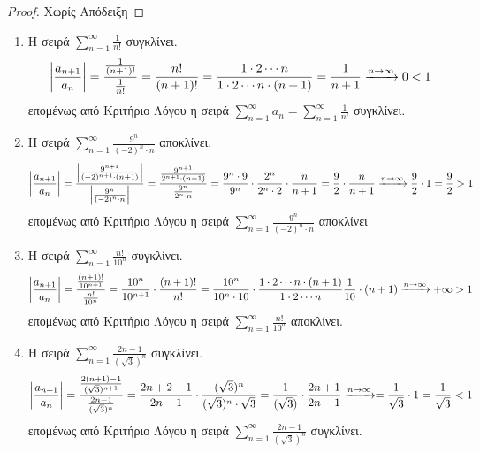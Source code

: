 \begin{proof}
    Χωρίς Απόδειξη
\end{proof}

\begin{examples}
\item {}
    \begin{enumerate}
        \item Η σειρά $ \sum_{n=1}^{\infty} \frac{1}{n!} $ συγκλίνει.
            \[
                \abs{\frac{a_{n+1}}{a_{n}}} = \frac{\frac{1}{(n+1)!}}{\frac{1}{n!}} = 
                \frac{n!}{(n+1)!} = \frac{1 \cdot 2 \cdots n }{1 \cdot 2 
                \cdots n \cdot(n+1)} = \frac{1}{n+1} \xrightarrow{n \to \infty } 0 < 1 
            \]
            επομένως από Κριτήριο Λόγου η σειρά $ \sum_{n=1}^{\infty} a_{n} = 
            \sum_{n=1}^{\infty} \frac{1}{n!}$ συγκλίνει.

        \item Η σειρά $ \sum_{n=1}^{\infty} \frac{9^{n}}{(-2)^{n}\cdot n} $ αποκλίνει.
            \[
                \abs{\frac{a_{n+1}}{a_{n}}} = \frac{\abs{\frac{9^{n+1}}{(-2)^{n+1}\cdot
                (n+1)}}}{\abs{\frac{9^{n}}{(-2)^{n}\cdot n}}} = 
                \frac{\frac{9^{n+1}}{2^{n+1}\cdot (n+1)}}{\frac{9^{n}}{2^{n}\cdot n}} 
                = \frac{9^{n}\cdot 9}{9^{n}} \cdot \frac{2^{n}}{2^{n}\cdot 2}\cdot 
                \frac{n}{n+1} = \frac{9}{2} \cdot \frac{n}{n+1} \xrightarrow{n \to 
                \infty} \frac{9}{2} \cdot 1 = \frac{9}{2}> 1
            \] 
            επομένως από Κριτήριο Λόγου η σειρά 
            $ \sum_{n=1}^{\infty} \frac{9^{n}}{(-2)^{n}\cdot n} $ αποκλίνει

        \item Η σειρά $ \sum_{n=1}^{\infty} \frac{n!}{10^{n}} $ συγκλίνει.
            \[
                \abs{\frac{a_{n+1}}{a_{n}}} = 
                \frac{\frac{(n+1)!}{10^{n+1}}}{\frac{n!}{10^{n}}} =
                \frac{10^{n}}{10^{n+1}} \cdot \frac{(n+1)!}{n!} = 
                \frac{10^{n}}{10^{n} \cdot 10}
                \cdot \frac{1\cdot 2 \cdots n \cdot (n+1)}{1\cdot 2 \cdots n}  
                \frac{1}{10} \cdot (n+1) \xrightarrow{n \to \infty} + \infty > 1
            \] 
            επομένως από Κριτήριο Λόγου η σειρά 
            $ \sum_{n=1}^{\infty} \frac{n!}{10^{n}} $ αποκλίνει.

        \item Η σειρά $ \sum_{n=1}^{\infty} \frac{2n-1}{(\sqrt{3}) ^{n}} $ συγκλίνει.
            \[
                \abs{\frac{a_{n+1}}{a_{n}}} = \frac{\frac{2(n+1)-1}{(\sqrt{3}
                )^{n+1}}}{\frac{2n-1}{(\sqrt{3} )^{n}}} = \frac{2n+2-1}{2n-1} \cdot 
                \frac{(\sqrt{3} )^{n}}{(\sqrt{3} )^{n}\cdot \sqrt{3}} = 
                \frac{1}{(\sqrt{3})} \cdot \frac{2n+1}{2n-1} 
                \xrightarrow{n \to \infty} = \frac{1}{\sqrt{3}} \cdot 1 =
                \frac{1}{\sqrt{3}} < 1
            \] 
            επομένως από Κριτήριο Λόγου η σειρά 
            $ \sum_{n=1}^{\infty} \frac{2n-1}{(\sqrt{3}) ^{n}} $ συγκλίνει.
    \end{enumerate}
\end{examples}

